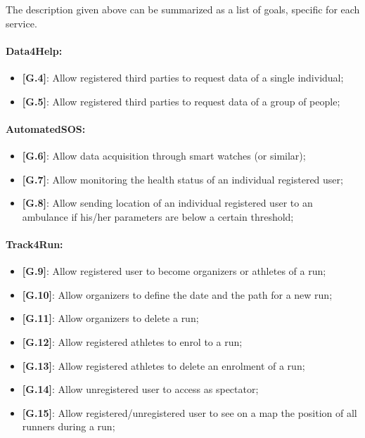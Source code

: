 The description given above can be summarized as a list of goals, specific for each service.
\paragraph{Data4Help:}
\begin{itemize}
  \item \textbf{[G.4]}: Allow registered third parties to request data of a single individual;
  \item \textbf{[G.5]}: Allow registered third parties to request data of a group of people;
\end{itemize}

\paragraph{AutomatedSOS:}
\begin{itemize}
  \item \textbf{[G.6]}: Allow data acquisition through smart watches (or similar);
  \item \textbf{[G.7]}: Allow monitoring the health status of an individual registered user;
  \item \textbf{[G.8]}: Allow sending location of an individual registered user to an ambulance if his/her parameters are below a certain threshold;
\end{itemize}

\paragraph{Track4Run:}
\begin{itemize}
  \item \textbf{[G.9]}: Allow registered user to become organizers or athletes of a run;
  \item \textbf{[G.10]}: Allow organizers to define the date and the path for a new run;
  \item \textbf{[G.11]}: Allow organizers to delete a run;
  \item \textbf{[G.12]}: Allow registered athletes to enrol to a run;
  \item \textbf{[G.13]}: Allow registered athletes to delete an enrolment of a run;
  \item \textbf{[G.14]}: Allow unregistered user to access as spectator;
  \item \textbf{[G.15]}: Allow registered/unregistered user to see on a map the position of all runners during a run;
\end{itemize}

